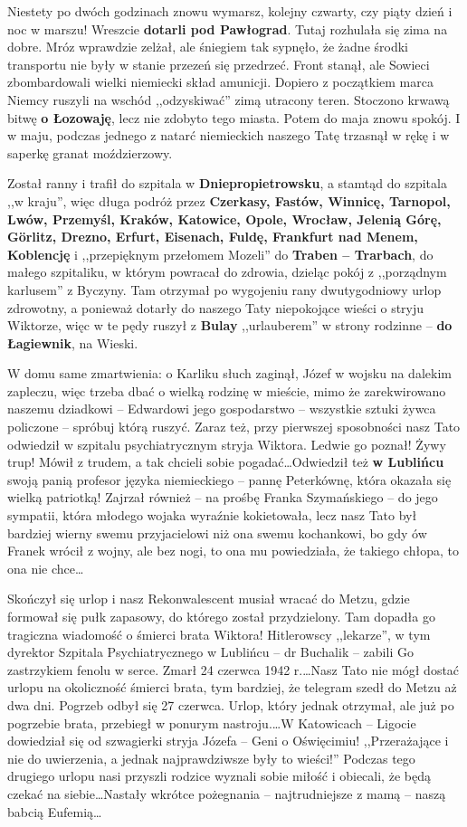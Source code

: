 Niestety po dwóch godzinach znowu wymarsz, kolejny czwarty, czy piąty dzień i noc w marszu! Wreszcie \textbf{dotarli pod Pawłograd}. Tutaj rozhulała się zima na dobre. Mróz wprawdzie zelżał, ale śniegiem tak sypnęło, że żadne środki transportu nie były w stanie przezeń się przedrzeć. Front stanął, ale Sowieci zbombardowali wielki niemiecki skład amunicji. Dopiero z początkiem marca Niemcy ruszyli na wschód ,,odzyskiwać'' zimą utracony teren. Stoczono krwawą bitwę \textbf{o Łozowaję}, lecz nie zdobyto tego miasta. Potem do maja znowu spokój. I w maju, podczas jednego z natarć niemieckich naszego Tatę trzasnął w rękę i w saperkę granat moździerzowy.

Został ranny i trafił do szpitala w \textbf{Dniepropietrowsku}, a stamtąd do szpitala ,,w kraju'', więc długa podróż przez \textbf{Czerkasy, Fastów, Winnicę, Tarnopol, Lwów, Przemyśl, Kraków, Katowice, Opole, Wrocław, Jelenią Górę, Görlitz, Drezno, Erfurt, Eisenach, Fuldę, Frankfurt nad Menem, Koblencję} i ,,przepięknym przełomem Mozeli'' do \textbf{Traben -- Trarbach}, do małego szpitaliku, w którym powracał do zdrowia, dzieląc pokój z ,,porządnym karlusem'' z Byczyny. Tam otrzymał po wygojeniu rany dwutygodniowy urlop zdrowotny, a ponieważ dotarły do naszego Taty niepokojące wieści o stryju Wiktorze, więc w te pędy ruszył z \textbf{Bulay} ,,urlauberem'' w strony rodzinne -- \textbf{do Łagiewnik}, na Wieski. 

W domu same zmartwienia: o Karliku słuch zaginął, Józef w wojsku na dalekim zapleczu, więc trzeba dbać o wielką rodzinę w mieście, mimo że zarekwirowano naszemu dziadkowi -- Edwardowi jego gospodarstwo -- wszystkie sztuki żywca policzone -- spróbuj którą ruszyć. Zaraz też, przy pierwszej sposobności nasz Tato odwiedził w szpitalu psychiatrycznym stryja Wiktora. Ledwie go poznał! Żywy trup! Mówił z trudem, a tak chcieli sobie pogadać\ldots Odwiedził też \textbf{w Lublińcu} swoją panią profesor języka niemieckiego -- pannę Peterkównę, która okazała się wielką patriotką! Zajrzał również -- na prośbę Franka Szymańskiego -- do jego sympatii, która młodego wojaka wyraźnie kokietowała, lecz nasz Tato był bardziej wierny swemu przyjacielowi niż ona swemu kochankowi, bo gdy ów Franek wrócił z wojny, ale bez nogi, to ona mu powiedziała, że takiego chłopa, to ona nie chce\ldots

Skończył się urlop i nasz Rekonwalescent musiał wracać do Metzu, gdzie formował się pułk zapasowy, do którego został przydzielony. Tam dopadła go tragiczna wiadomość o śmierci brata Wiktora! Hitlerowscy ,,lekarze'', w tym dyrektor Szpitala Psychiatrycznego w Lublińcu -- dr Buchalik -- zabili Go zastrzykiem fenolu w serce. Zmarł 24 czerwca 1942 r.\ldots Nasz Tato nie mógł dostać urlopu na okoliczność śmierci brata, tym bardziej, że telegram szedł do Metzu aż dwa dni. Pogrzeb odbył się 27 czerwca. Urlop, który jednak otrzymał, ale już po pogrzebie brata, przebiegł w ponurym nastroju.\ldots W Katowicach -- Ligocie dowiedział się od szwagierki stryja Józefa -- Geni o Oświęcimiu! ,,Przerażające i nie do uwierzenia, a jednak najprawdziwsze były to wieści!'' Podczas tego drugiego urlopu nasi przyszli rodzice wyznali sobie miłość i obiecali, że będą czekać na siebie\ldots Nastały wkrótce pożegnania -- najtrudniejsze z mamą -- naszą babcią Eufemią\ldots

